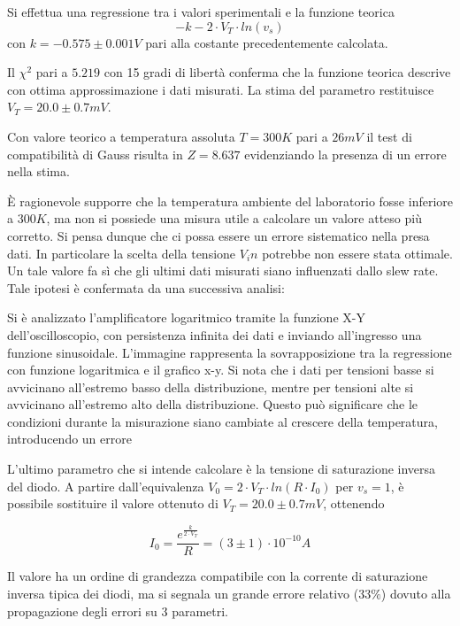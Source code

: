 \documentclass[journal]{IEEEtran}
\begin{document}
Si effettua una regressione tra i valori sperimentali e la funzione teorica 
\begin{equation}
-k - 2 \cdot V_T \cdot ln(v_s)
\end{equation}
con $k = -0.575 \pm 0.001 V$ pari alla costante precedentemente calcolata.

Il $\chi^2$ pari a $5.219$ con 15 gradi di libertà conferma che la funzione teorica descrive con ottima approssimazione i dati misurati.
La stima del parametro restituisce $V_T = 20.0 \pm 0.7 mV$.

Con valore teorico a temperatura assoluta $T = 300K$ pari a $26 mV$ il test di compatibilità di Gauss risulta in $Z = 8.637$ evidenziando la presenza di un errore nella stima.

È ragionevole supporre che la temperatura ambiente del laboratorio fosse inferiore a $300 K$, ma non si possiede una misura utile a calcolare un valore atteso più corretto.
Si pensa dunque che ci possa essere un errore sistematico nella presa dati. In particolare la scelta della tensione $V_in$ potrebbe non essere stata ottimale. Un tale valore
fa sì che gli ultimi dati misurati siano influenzati dallo slew rate. Tale ipotesi è confermata da una successiva analisi:

Si è analizzato l'amplificatore logaritmico tramite la funzione X-Y dell'oscilloscopio, con persistenza infinita dei dati e inviando all'ingresso una funzione sinusoidale. L'immagine rappresenta la sovrapposizione tra la regressione con funzione logaritmica e il grafico x-y. Si nota che i dati per tensioni basse si avvicinano
all'estremo basso della distribuzione, mentre per tensioni alte si avvicinano all'estremo alto della distribuzione. Questo può significare che le condizioni durante la
misurazione siano cambiate al crescere della temperatura, introducendo un errore

L'ultimo parametro che si intende calcolare è la tensione di saturazione inversa del diodo.
A partire dall'equivalenza $V_0 = 2 \cdot V_T \cdot ln(R \cdot I_0)$  per $v_s = 1$, è possibile sostituire il valore ottenuto di $V_T = 20.0 \pm 0.7 mV$, ottenendo

\[ I_0 = \frac{e^{\frac{k}{2 \cdot V_T}}}{R} = (3 \pm 1) \cdot 10^{-10} A \]

Il valore ha un ordine di grandezza compatibile con la corrente di saturazione inversa tipica dei diodi, ma si segnala un grande errore relativo ($33 \% $) dovuto alla propagazione degli errori su 3 parametri.


\end{document}
